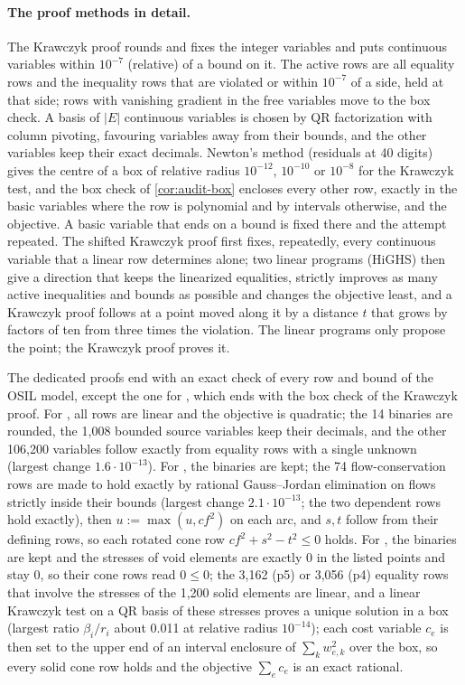 \paragraph{The proof methods in detail.}
The Krawczyk proof rounds and fixes the integer variables and puts continuous variables within $10^{-7}$ (relative) of a bound on it.
The active rows are all equality rows and the inequality rows that are violated or within $10^{-7}$ of a side, held at that side; rows with vanishing gradient in the free variables move to the box check.
A basis of $|E|$ continuous variables is chosen by QR factorization with column pivoting, favouring variables away from their bounds, and the other variables keep their exact decimals.
Newton's method (residuals at 40 digits) gives the centre of a box of relative radius $10^{-12}$, $10^{-10}$ or $10^{-8}$ for the Krawczyk test, and the box check of \cref{cor:audit-box} encloses every other row, exactly in the basic variables where the row is polynomial and by intervals otherwise, and the objective.
A basic variable that ends on a bound is fixed there and the attempt repeated.
The shifted Krawczyk proof first fixes, repeatedly, every continuous variable that a linear row determines alone; two linear programs (HiGHS) then give a direction that keeps the linearized equalities, strictly improves as many active inequalities and bounds as possible and changes the objective least, and a Krawczyk proof follows at a point moved along it by a distance $t$ that grows by factors of ten from three times the violation.
The linear programs only propose the point; the Krawczyk proof proves it.

The dedicated proofs end with an exact check of every row and bound of the OSIL model, except the one for , which ends with the box check of the Krawczyk proof.
For , all rows are linear and the objective is quadratic; the 14 binaries are rounded, the 1,008 bounded source variables keep their decimals, and the other 106,200 variables follow exactly from equality rows with a single unknown (largest change $1.6\cdot10^{-13}$).
For , the binaries are kept; the 74 flow-conservation rows are made to hold exactly by rational Gauss--Jordan elimination on flows strictly inside their bounds (largest change $2.1\cdot10^{-13}$; the two dependent rows hold exactly), then $u:=\max(u,cf^2)$ on each arc, and $s,t$ follow from their defining rows, so each rotated cone row $cf^2+s^2-t^2\le0$ holds.
For , the binaries are kept and the stresses of void elements are exactly 0 in the listed points and stay 0, so their cone rows read $0\le0$; the 3,162 (p5) or 3,056 (p4) equality rows that involve the stresses of the 1,200 solid elements are linear, and a linear Krawczyk test on a QR basis of these stresses proves a unique solution in a box (largest ratio $\beta_i/r_i$ about 0.011 at relative radius $10^{-14}$); each cost variable $c_e$ is then set to the upper end of an interval enclosure of $\sum_k w_{e,k}^2$ over the box, so every solid cone row holds and the objective $\sum_ec_e$ is an exact rational.

